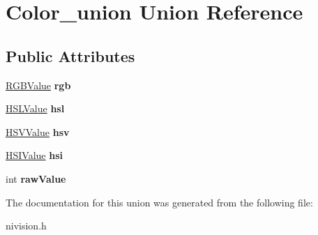 \hypertarget{unionColor__union}{\section{\-Color\-\_\-union \-Union \-Reference}
\label{unionColor__union}
}
\subsection*{\-Public \-Attributes}
\begin{DoxyCompactItemize}
\item 
\hypertarget{unionColor__union_a54f243f61bb7d264b2cc54525382596a}{\hyperlink{structRGBValue__struct}{\-R\-G\-B\-Value} {\bfseries rgb}}\label{unionColor__union_a54f243f61bb7d264b2cc54525382596a}

\item 
\hypertarget{unionColor__union_a7a6ddfcb30fa0cfed8be5581f1cb4d1d}{\hyperlink{structHSLValue__struct}{\-H\-S\-L\-Value} {\bfseries hsl}}\label{unionColor__union_a7a6ddfcb30fa0cfed8be5581f1cb4d1d}

\item 
\hypertarget{unionColor__union_ac908719b3193966e15169b9741955297}{\hyperlink{structHSVValue__struct}{\-H\-S\-V\-Value} {\bfseries hsv}}\label{unionColor__union_ac908719b3193966e15169b9741955297}

\item 
\hypertarget{unionColor__union_a5f95361ea1dee5fc560beb69301da4bc}{\hyperlink{structHSIValue__struct}{\-H\-S\-I\-Value} {\bfseries hsi}}\label{unionColor__union_a5f95361ea1dee5fc560beb69301da4bc}

\item 
\hypertarget{unionColor__union_ade3dc846117f40337c130bed0aec6811}{int {\bfseries raw\-Value}}\label{unionColor__union_ade3dc846117f40337c130bed0aec6811}

\end{DoxyCompactItemize}


\-The documentation for this union was generated from the following file\-:\begin{DoxyCompactItemize}
\item 
nivision.\-h\end{DoxyCompactItemize}
